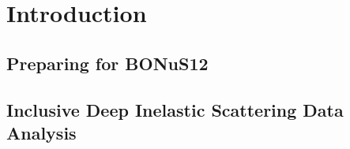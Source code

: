 \chapter{Introduction}
\label{ch:introduction}

\section{Preparing for BONuS12}
\section{Inclusive Deep Inelastic Scattering Data Analysis}